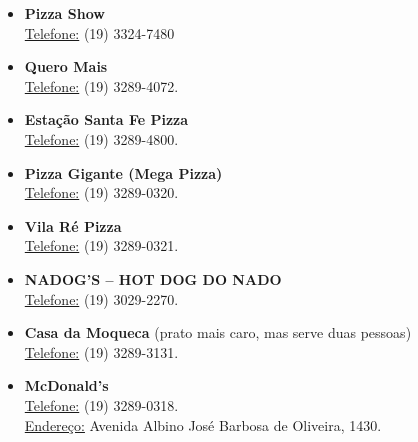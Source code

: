 \begin{itemize}
\item  \textbf{Pizza Show}
\\\underline{Telefone:} (19) 3324-7480
\end{itemize}

\begin{itemize}
\item  \textbf{Quero Mais}
\\\underline{Telefone:} (19) 3289-4072.
\end{itemize}

\begin{itemize}
\item  \textbf{Estação Santa Fe Pizza}
\\\underline{Telefone:} (19) 3289-4800.
\end{itemize}

\begin{itemize}
\item  \textbf{Pizza Gigante (Mega Pizza)}
\\\underline{Telefone:} (19) 3289-0320.
\end{itemize}

\begin{itemize}
\item  \textbf{Vila Ré Pizza}
\\\underline{Telefone:} (19) 3289-0321.
\end{itemize}

\begin{itemize}
\item  \textbf{NADOG'S -- HOT DOG DO NADO}
\\\underline{Telefone:} (19) 3029-2270.
\end{itemize}

\begin{itemize}
\item  \textbf{Casa da Moqueca} (prato mais caro, mas serve duas pessoas)
\\\underline{Telefone:} (19) 3289-3131.
\end{itemize}

\begin{itemize}
\item  \textbf{McDonald's}
\\\underline{Telefone:} (19) 3289-0318.
\\\underline{Endereço:} Avenida Albino José Barbosa de Oliveira, 1430.
\end{itemize}

